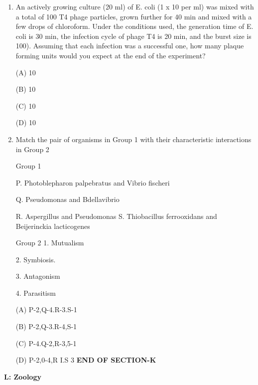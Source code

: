 \documentclass[journal]{IEEEtran}
\begin{document}
\begin{enumerate}
\begin{minipage}{0.5\textwidth}
\begin{flushleft}
3. Hyphomicrobium

4. Clostridium
		\end{flushleft}
		\end{minipage}



(A) P-4, Q-1.R-2,5-3

(B) P-4, Q-1,R-3,5-2

(C) P-2, Q-4.R-1.S-3

(D) P-1. Q-4.R-2,S-3

\item {An actively growing culture (20 ml) of E. coli (1 x 10 per ml) was mixed with a total of 100 T4 phage particles, grown further for 40 min and mixed with a few drops of chloroform. Under the conditions used, the generation time of E. coli is 30 min, the infection cycle of phage T4 is 20 min, and the burst size is 100). Assuming that each infection was a successful one, how many plaque forming units would you expect at the end of the experiment?

(A) 10

(B) 10

(C) 10

(D) 10
}
\item {Match the pair of organisms in Group 1 with their characteristic interactions in Group 2}
\newline
\begin{minipage}{0.5\textwidth}
	\begin{flushleft}

Group 1

P. Photoblepharon palpebratus and Vibrio fischeri

Q. Pseudomonas and Bdellavibrio

R. Aspergillus and Pseudomonas
S. Thiobacillus ferrooxidans and Beijerinckia lacticogenes

		\end{flushleft}
		\end{minipage}
	\begin{minipage}{0.5\textwidth}
		\begin{flushleft}

Group 2
1. Mutualism

2. Symbiosis.


3. Antagonism


4. Parasitism
		\end{flushleft}
		\end{minipage}


(A) P-2,Q-4.R-3.S-1

(B) P-2,Q-3.R-4,S-1

(C) P-4.Q-2,R-3,5-1

(D) P-2,0-4,R I.S 3
\newline
\textbf{END OF SECTION-K}

\end{enumerate}
\newpage
		\textbf{L: Zoology}
\end{document}
